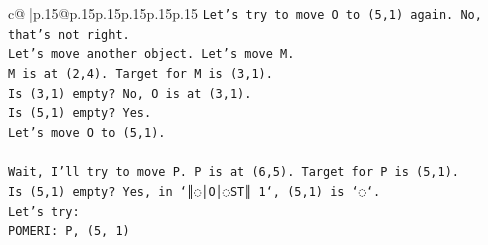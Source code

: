 \documentclass{article}
\begin{document}
{\begin{supertabular}{c@{$\;$}|p{.15\linewidth}@{}p{.15\linewidth}p{.15\linewidth}p{.15\linewidth}p{.15\linewidth}p{.15\linewidth}}
{{{\texttt{Let's try to move O to (5,1) again. No, that's not right.} \\
\texttt{Let's move another object. Let's move M.} \\
\texttt{M is at (2,4). Target for M is (3,1).} \\
\texttt{Is (3,1) empty? No, O is at (3,1).} \\
\texttt{Is (5,1) empty? Yes.} \\
\texttt{Let's move O to (5,1).} \\
\\ 
\texttt{Wait, I'll try to move P. P is at (6,5). Target for P is (5,1).} \\
\texttt{Is (5,1) empty? Yes, in `║◌│O│◌ST║ 1`, (5,1) is `◌`.} \\
\texttt{Let's try:} \\
\texttt{POMERI: P, (5, 1)} \\
            }
        }
    }
     \\ \\


\end{supertabular}}
\end{document}
